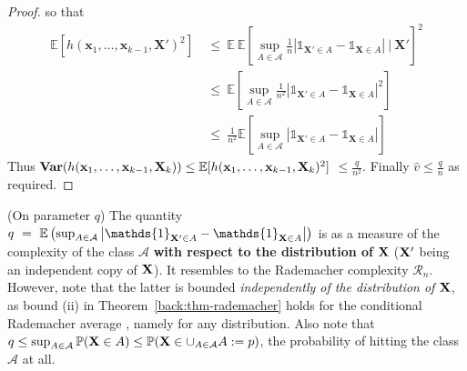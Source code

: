 \begin{proof}
\noindent
so that 
\begin{align*}
\mathbb{E} \left [ h(\mathbf{x}_1,\ldots,\mathbf{x}_{k-1},\mathbf{X}')^2\right] &~\le~ \mathbb{E}~ \mathbb{E} \left [  \sup_{A \in \mathcal{A}} \frac{1}{n} \left | \mathds{1}_{\mathbf{X}' \in A} - \mathds{1}_{\mathbf{X} \in A}  \right| ~\Big|~ \mathbf{X}' \right]^2 \\
&~\le~ \mathbb{E} \left [  \sup_{A \in \mathcal{A}} \frac{1}{n^2} \left | \mathds{1}_{\mathbf{X}' \in A} - \mathds{1}_{\mathbf{X} \in A}  \right|^2 \right] \\
&~\le~ \frac{1}{n^2} \mathbb{E} \left [  \sup_{A \in \mathcal{A}}  \left | \mathds{1}_{\mathbf{X}' \in A} - \mathds{1}_{\mathbf{X} \in A}  \right|  \right] 
\end{align*}
\noindent
Thus $\mathbf{Var}(h(\mathbf{x}_1,\ldots,\mathbf{x}_{k-1},\mathbf{X}_k)) \le \mathbb{E} [h(\mathbf{x}_1,\ldots,\mathbf{x}_{k-1},\mathbf{X}_k)^2]$ $ \le \frac{q}{n^2}$. Finally $\hat v \le \frac{q}{n}$ as required.
\end{proof}

\begin{remark}({\sc On parameter} $q$)
The quantity $q~=~ \mathbb{E}\left ( \sup_{A \in \mathcal{A}} \left | \mathds{1}_{\mb X' \in A} - \mathds{1}_{\mb X \in A} \right|\right)$ is as a measure of the complexity of the class $\mathcal{A}$ \textbf{with respect to the distribution of} $\mathbf X$ ($\mathbf X'$ being an independent copy of $\mathbf X$). It resembles to the Rademacher complexity $\mathcal{R}_n$. %
However, note that the latter is bounded \emph{independently of the distribution of } $\mathbf X$, as bound (ii) in Theorem~\ref{back:thm-rademacher} holds for the conditional Rademacher average %
, namely for any distribution.
%
Also note that $q \le \sup_{A \in \mathcal{A}} \mathbb{P}(\mathbf X \in A) \le \mathbb{P}(\mathbf X \in \cup_{A \in \mathcal{A}}A :=p) $, the probability of hitting the class $\mathcal{A}$ at all.
\end{remark}

